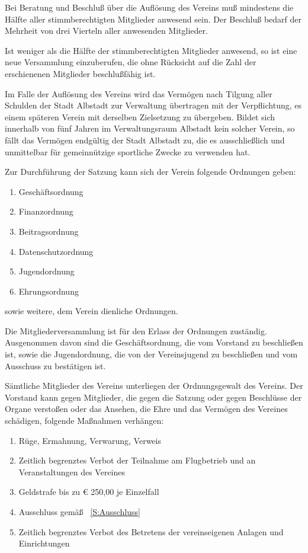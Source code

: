 \documentclass[10pt,a4paper,parskip=half]{scrartcl}
\begin{document}
\begin{contract}
    Bei Beratung und Beschluß über die Auflösung des Vereins muß mindestens die Hälfte aller stimmberechtigten Mitglieder anwesend sein.
    Der Beschluß bedarf der Mehrheit von drei Vierteln aller anwesenden Mitglieder.
    
    Ist weniger als die Hälfte der stimmberechtigten Mitglieder anwesend,
    so ist eine neue Versammlung einzuberufen,
    die ohne Rücksicht auf die Zahl der erschienenen Mitglieder beschlußfähig ist.
    
    Im Falle der Auflösung des Vereins wird das Vermögen nach Tilgung aller Schulden der Stadt Albstadt zur Verwaltung übertragen mit der Verpflichtung,
    es einem späteren Verein mit derselben Zielsetzung zu übergeben.
    Bildet sich innerhalb von fünf Jahren im Verwaltungsraum Albstadt kein solcher Verein,
    so fällt das Vermögen endgültig der Stadt Albstadt zu,
    die es ausschließlich und unmittelbar für gemeinnützige sportliche Zwecke zu verwenden hat.
    
    
    Zur Durchführung der Satzung kann sich der Verein folgende Ordnungen geben:
    \begin{enumerate}[label=\alph*),noitemsep]
      \item Geschäftsordnung
      \item Finanzordnung
      \item Beitragsordnung
      \item Datenschutzordnung
      \item Jugendordnung
      \item Ehrungsordnung
    \end{enumerate}
    sowie weitere, dem Verein dienliche Ordnungen.
    
    Die Mitgliederversammlung ist für den Erlass der Ordnungen zuständig.
    Ausgenommen davon sind die Geschäftsordnung,
    die vom Vorstand zu beschließen ist,
    sowie die Jugendordnung,
    die von der Vereinsjugend zu beschließen und vom Ausschuss zu bestätigen ist.
    
    
    Sämtliche Mitglieder des Vereins unterliegen der Ordnungsgewalt des Vereins.
    Der Vorstand kann gegen Mitglieder,
    die gegen die Satzung oder gegen Beschlüsse der Organe verstoßen oder das Ansehen,
    die Ehre und das Vermögen des Vereines schädigen,
    folgende Maßnahmen verhängen:
    \begin{enumerate}[label=\alph*),noitemsep]
      \item Rüge, Ermahnung, Verwarung, Verweis
      \item Zeitlich begrenztes Verbot der Teilnahme am Flugbetrieb und an Veranstaltungen des Vereines
      \item Geldstrafe bis zu € 250,00 je Einzelfall
      \item Ausschluss gemäß ~\autoref{S:Ausschluss}
      \item Zeitlich begrenztes Verbot des Betretens der vereinseigenen Anlagen und Einrichtungen
    \end{enumerate}
    

\end{contract}
\end{document}
